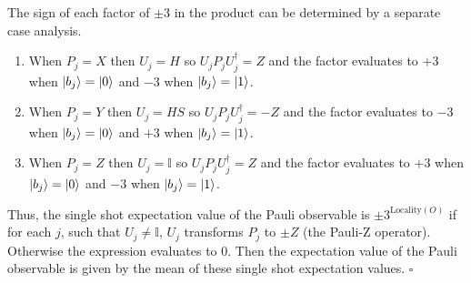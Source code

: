 \documentclass[12pt]{article}
\begin{document}
    The sign of each factor of $\pm 3$ in the product can be determined by a separate case analysis.
    \begin{enumerate}
        \item When $P_j = X$ then $U_j = H$ so $U_jP_j U^\dagger_j = Z$ and the factor evaluates to $+3$ when $\ket{b_j} = \ket{0}$ and $-3$ when $\ket{b_j} = \ket{1}$.
        \item When $P_j = Y$ then $U_j = HS$ so $U_jP_j U^\dagger_j = -Z$ and the factor evaluates to $-3$ when $\ket{b_j} = \ket{0}$ and $+3$ when $\ket{b_j} = \ket{1}$.
        \item When $P_j = Z$ then $U_j = \mathbb{I}$ so $U_jP_j U^\dagger_j = Z$ and the factor evaluates to $+3$ when $\ket{b_j} = \ket{0}$ and $-3$ when $\ket{b_j} = \ket{1}$.
    \end{enumerate}

    Thus, the single shot expectation value of the Pauli observable is $\pm3^{\text{Locality}(O)}$ if for each $j$, such that $U_j \neq \mathbb{I}$, $U_j$ transforms $P_j$ to $\pm Z$ (the Pauli-Z operator). Otherwise the expression evaluates to 0. Then the expectation value of the Pauli observable is given by the mean of these single shot expectation values. \hfill $\square$

    \printbibliography[title={References}]
\end{document}
